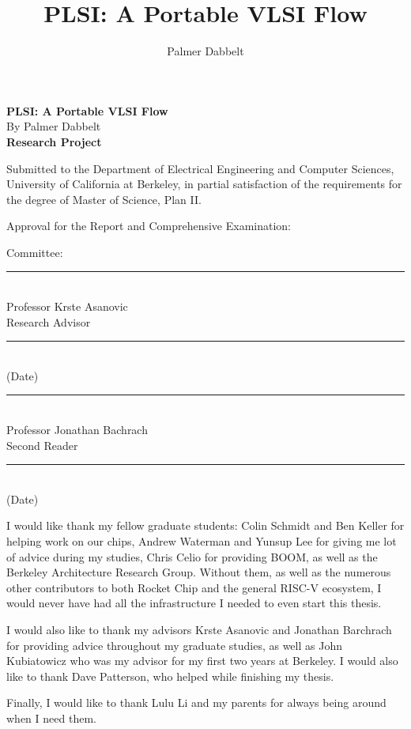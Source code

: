 \documentclass[masters2]{ucbthesis}
\author{Palmer Dabbelt}
\title{PLSI: A Portable VLSI Flow}
\begin{document}
\thispagestyle{empty}
\large
\begin{center}
\textbf{PLSI: A Portable VLSI Flow}\\
By Palmer Dabbelt\\
\textbf{Research Project}\\
\end{center}

\normalsize
Submitted to the Department of Electrical Engineering and Computer Sciences,
University of California at Berkeley, in partial satisfaction of the
requirements for the degree of Master of Science, Plan II.

Approval for the Report and Comprehensive Examination:

\begin{center}
Committee:\\
\vspace{0.5in}\rule{5in}{1pt}\\
Professor Krste Asanovic\\
Research Advisor\\
\vspace{0.5in}\rule{5in}{1pt}\\
(Date)\\
\vspace{0.5in}\rule{5in}{1pt}\\
Professor Jonathan Bachrach\\
Second Reader\\
\vspace{0.5in}\rule{5in}{1pt}\\
(Date)\\
\end{center}

\copyrightpage

\begin{frontmatter}

\tableofcontents
\clearpage
\listoffigures

\begin{acknowledgements}
I would like thank my fellow graduate students: Colin Schmidt and Ben Keller
for helping work on our chips, Andrew Waterman and Yunsup Lee for giving me lot
of advice during my studies, Chris Celio for providing BOOM, as well as the
Berkeley Architecture Research Group.  Without them, as well as the numerous
other contributors to both Rocket Chip and the general RISC-V ecosystem, I
would never have had all the infrastructure I needed to even start this thesis.

I would also like to thank my advisors Krste Asanovic and Jonathan Barchrach
for providing advice throughout my graduate studies, as well as John
Kubiatowicz who was my advisor for my first two years at Berkeley.  I would
also like to thank Dave Patterson, who helped while finishing my thesis.

Finally, I would like to thank Lulu Li and my parents for always being around
when I need them.
\end{acknowledgements}

\end{frontmatter}

\pagestyle{headings}





\end{document}

